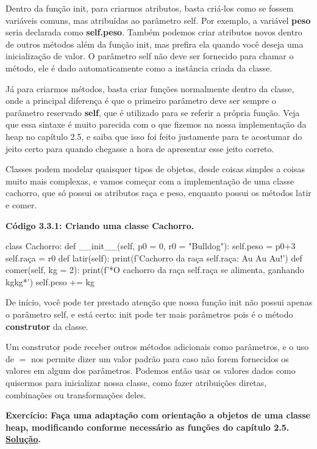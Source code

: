 \documentclass[11pt, a4paper]{article}
\begin{document}
Dentro da função init, para criarmos atributos, basta criá-los como se fossem variáveis comuns, mas atribuídas ao parâmetro self. Por exemplo, a variável \textbf{peso} seria declarada como \textbf{self.peso}. Também podemos criar atributos novos dentro de outros métodos além da função init, mas prefira ela quando você deseja uma inicialização de valor. O parâmetro self não deve ser fornecido para chamar o método, ele é dado automaticamente como a instância criada da classe.

Já para criarmos métodos, basta criar funções normalmente dentro da classe, onde a principal diferença é que o primeiro parâmetro deve ser sempre o parâmetro reservado \textbf{self}, que é utilizado para se referir a própria função. Veja que essa sintaxe é muito parecida com o que fizemos na nossa implementação da heap no capítulo 2.5, e saiba que isso foi feito justamente para te acostumar do jeito certo para quando chegasse a hora de apresentar esse jeito correto.

Classes podem modelar quaisquer tipos de objetos, desde coisas simples a coisas muito mais complexas, e vamos começar com a implementação de uma classe cachorro, que só possui os atributos raça e peso, enquanto possui os métodos latir e comer.

\textbf{Código 3.3.1: Criando uma classe Cachorro.}

\begin{code}
class Cachorro:
    def __init__(self, p0 = 0, r0 = "Bulldog"):
        self.peso = p0+3
        self.raça = r0
    def latir(self):
        print(f'Cachorro da raça {self.raça}: Au Au Au!')
    def comer(self, kg = 2):
        print(f'*O cachorro da raça {self.raça} se alimenta, ganhando {kg}kg*')
        self.peso += kg
\end{code}

De início, você pode ter prestado atenção que nossa função init não possui apenas o parâmetro self, e está certo: init pode ter mais parâmetros pois é o método \textbf{construtor} da classe.

Um construtor pode receber outros métodos adicionais como parâmetros, e o uso de \(=\) nos permite dizer um valor padrão para caso não forem fornecidos os valores em algum dos parâmetros. Podemos então usar os valores dados como quisermos para inicializar nossa classe, como fazer atribuições diretas, combinações ou transformações deles.

\label{ex3.3.a}
\textbf{Exercício: Faça uma adaptação com orientação a objetos de uma classe heap, modificando conforme necessário as funções do capítulo 2.5. \hyperref[sol_ex3.3.a]{Solução}.}
\end{document}
